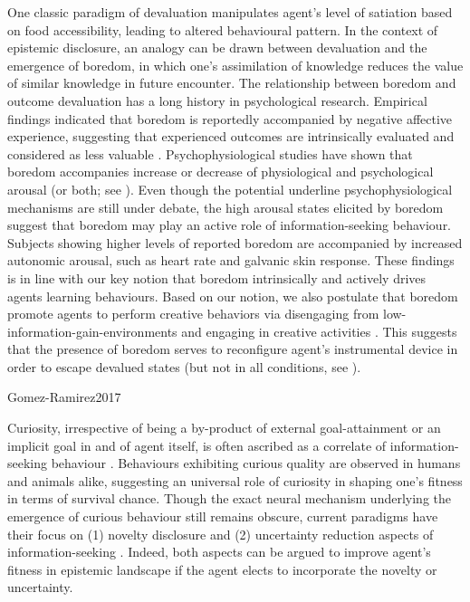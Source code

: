 \documentclass[utf8]{frontiersSCNS}
\begin{document}
One classic paradigm of devaluation manipulates agent's level of satiation based on food accessibility, leading to altered behavioural pattern. In the context of epistemic disclosure, an analogy can be drawn between devaluation and the emergence of boredom, in which one's assimilation of knowledge reduces the value of similar knowledge in future encounter. The relationship between boredom and outcome devaluation has a long history in psychological research. Empirical findings indicated that boredom is reportedly accompanied by negative affective experience, suggesting that experienced outcomes are intrinsically evaluated and considered as less valuable \citep{bench2013function, van2012boredom, fahlman2009does, perkins1985cognitive, vodanovich1991boredom}. 
\label{rev:arousal}Psychophysiological studies have shown that boredom accompanies increase \citep{berlyne1960conflict, london1972increase, harris2000correlates} or decrease \citep{barmack1939definition, geiwitz1966structure, pattyn2008psychophysiological, vogel2012definition, mikulas1993essence} of physiological and psychological arousal (or both; see \cite{eastwood2012unengaged, fahlman2013development, Merrifield2014, Danckert.2018}). Even though the potential underline psychophysiological mechanisms are still under debate, the high arousal states elicited by boredom suggest that boredom may play an active role of information-seeking behaviour. Subjects showing higher levels of reported boredom are accompanied by increased autonomic arousal, such as heart rate and galvanic skin response. These findings is in line with our key notion that boredom intrinsically and actively drives agents learning behaviours. 
Based on our notion, we also postulate that boredom promote agents to perform creative behaviors via disengaging from low-information-gain-environments and engaging in creative activities \citep{harris2000correlates, schubert1977boredom, schubert1978creativity}. This suggests that the presence of boredom serves to reconfigure agent's instrumental device in order to escape devalued states (but not in all conditions, see \cite{larson1990emotions}).

\label{rev:creativity}
Gomez-Ramirez2017


Curiosity, irrespective of being a by-product of external goal-attainment or an implicit goal in and of agent itself, is often ascribed as a correlate of information-seeking behaviour \citep{2013gottlieb}. Behaviours exhibiting curious quality are observed in humans and animals alike, suggesting an universal role of curiosity in shaping one's fitness in terms of survival chance. Though the exact neural mechanism underlying the emergence of curious behaviour still remains obscure, current paradigms have their focus on (1) novelty disclosure and (2) uncertainty reduction aspects of information-seeking \citep{pathak2017icm, friston2017curiosity, bellemare2016count, ostrovski2017count}. Indeed, both aspects can be argued to improve agent's fitness in epistemic landscape if the agent elects to incorporate the novelty or uncertainty.
\end{document}
